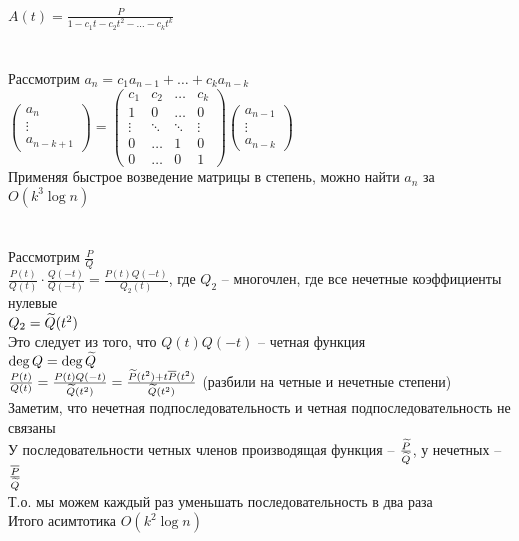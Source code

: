 \documentclass[12pt]{article}
\begin{document}
$A(t) = \frac{P}{1-c_1t-c_2t^2 - \ldots - c_kt^k}$\\\\\\
Рассмотрим $a_n = c_1a_{n-1} + \ldots + c_ka_{n-k}$\\
$\begin{pmatrix}
    a_n\\\vdots\\a_{n-k+1}
\end{pmatrix} = \begin{pmatrix}
    c_1 & c_2 & \ldots & c_k\\
    1 & 0 & \ldots & 0\\
    \vdots & \ddots & \ddots & \vdots\\
    0 & \ldots & 1 & 0\\
    0 & \ldots & 0 & 1
\end{pmatrix}\begin{pmatrix}
    a_{n-1}\\\vdots\\a_{n-k}
\end{pmatrix}$\\
Применяя быстрое возведение матрицы в степень, можно найти $a_n$ за $O(k^3\log n)$\\\\\\
Рассмотрим $\frac{P}{Q}$\\
$\frac{P(t)}{Q(t)} \cdot \frac{Q(-t)}{Q(-t)} = \frac{P(t)Q(-t)}{Q_2(t)}$, где $Q_2$ -- многочлен, где все нечетные коэффициенты нулевые\\
$Q_2 = \widetilde Q(t^2)$\\
Это следует из того, что $Q(t)Q(-t)$ -- четная функция\\
$\deg Q = \deg \widetilde Q$\\
$\frac{P(t)}{Q(t)} = \frac{P(t)Q(-t)}{\widetilde Q(t^2)} = \frac{\widetilde P(t^2) + t\overline P(t^2)}{\widetilde Q(t^2)}$ (разбили на четные и нечетные степени)\\
Заметим, что нечетная подпоследовательность и четная подпоследовательность не связаны\\
У последовательности четных членов производящая функция -- $\frac{\widetilde P}{\widetilde Q}$, у нечетных -- $\frac{\overline P}{\widetilde Q}$\\
Т.о. мы можем каждый раз уменьшать последовательность в два раза\\
Итого асимтотика $O(k^2\log n)$\\
\end{document}

